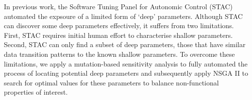 In previous work, the Software Tuning Panel for Autonomic Control 
(STAC)~\cite{Brake:2008:ADS:1370018.1370031} automated the expsoure of a
limited form of `deep' parameters. 
Although STAC
can discover some deep parameters effectively, it suffers from two
limitations. First, STAC requires initial human effort to characterise
shallow parameters. Second, STAC can only find a subset of deep parameters,
those that have similar data transition patterns to the known shallow
parameters. To overcome these limitations, we apply a mutation-based
sensitivity analysis to fully automated the process of locating potential
deep parameters and subsequently apply NSGA II to search for optimal values
for these parameters to balance non-functional properties of interest. 
